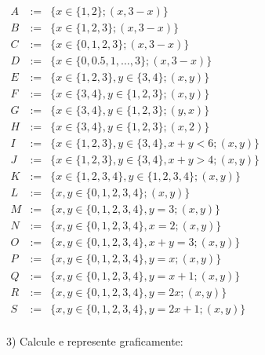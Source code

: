 \documentclass[oneside]{book}
\begin{document}
$\begin{array}{rcl}
 A & := & \{x∈\{1,2\}; (x,3-x)\} \\
 B & := & \{x∈\{1,2,3\}; (x,3-x)\} \\
 C & := & \{x∈\{0,1,2,3\}; (x,3-x)\} \\
 D & := & \{x∈\{0,0.5,1, \ldots, 3\}; (x,3-x)\} \\
 E & := & \{x∈\{1,2,3\}, y∈\{3,4\}; (x,y)\} \\
 F & := & \{x∈\{3,4\}, y∈\{1,2,3\}; (x,y)\} \\
 G & := & \{x∈\{3,4\}, y∈\{1,2,3\}; (y,x)\} \\
 H & := & \{x∈\{3,4\}, y∈\{1,2,3\}; (x,2)\} \\
 I & := & \{x∈\{1,2,3\}, y∈\{3,4\}, x+y<6; (x,y)\} \\
 J & := & \{x∈\{1,2,3\}, y∈\{3,4\}, x+y>4; (x,y)\} \\
 K & := & \{x∈\{1,2,3,4\}, y∈\{1,2,3,4\}; (x,y)\} \\
 L & := & \{x,y∈\{0,1,2,3,4\}; (x,y)\} \\
 M & := & \{x,y∈\{0,1,2,3,4\}, y=3; (x,y)\} \\
 N & := & \{x,y∈\{0,1,2,3,4\}, x=2; (x,y)\} \\
 O & := & \{x,y∈\{0,1,2,3,4\}, x+y=3; (x,y)\} \\
 P & := & \{x,y∈\{0,1,2,3,4\}, y=x; (x,y)\} \\
 Q & := & \{x,y∈\{0,1,2,3,4\}, y=x+1; (x,y)\} \\
 R & := & \{x,y∈\{0,1,2,3,4\}, y=2x; (x,y)\} \\
 S & := & \{x,y∈\{0,1,2,3,4\}, y=2x+1; (x,y)\} \\
\end{array}
$

\msk

3) Calcule e represente graficamente:
\end{document}
